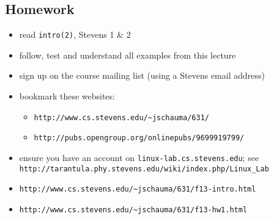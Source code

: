 \documentclass[xga]{xdvislides}
\begin{document}
\subsection{Homework}
\begin{itemize}
	\item read {\tt intro(2)}, Stevens 1 \& 2
	\item follow, test and understand all examples from this lecture
	\item sign up on the course mailing list (using a Stevens email address)
	\item bookmark these websites:
		\begin{itemize}
			\item {\tt http://www.cs.stevens.edu/\~{}jschauma/631/}
			\item {\tt http://pubs.opengroup.org/onlinepubs/9699919799/}
		\end{itemize}
	\item ensure you have an account on {\tt linux-lab.cs.stevens.edu}; see \\
		{\tt http://tarantula.phy.stevens.edu/wiki/index.php/Linux\_Lab}
	\vspace{.5in}
	\item {\tt http://www.cs.stevens.edu/\~{}jschauma/631/f13-intro.html}
	\item {\tt http://www.cs.stevens.edu/\~{}jschauma/631/f13-hw1.html}
\end{itemize}
\end{document}
